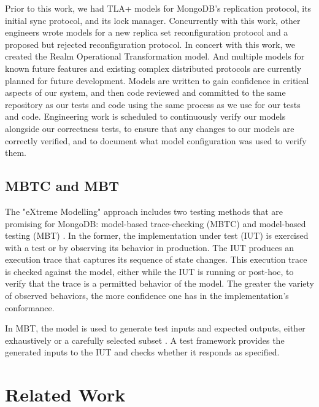 \documentclass{vldb}
\begin{document}
Prior to this work, we had TLA+ models for MongoDB's replication protocol, its initial sync protocol, and its lock manager.
Concurrently with this work, other engineers wrote models for a new replica set reconfiguration protocol and a proposed but rejected reconfiguration protocol.
In concert with this work, we created the Realm Operational Transformation model.
And multiple models for known future features and existing complex distributed protocols are currently planned for future development.
Models are written to gain confidence in critical aspects of our system, and then code reviewed and committed to the same repository as our tests and code using the same process as we use for our tests and code.
Engineering work is scheduled to continuously verify our models alongside our correctness tests, to ensure that any changes to our models are correctly verified, and to document what model configuration was used to verify them.

\subsection{MBTC and MBT}
\label{subsec:background_mbtc_mbt}

The "eXtreme Modelling" approach includes two testing methods that are promising for MongoDB: model-based trace-checking (MBTC) \cite{Jard83AnApproachToTestingSpecifications, MBTC} and model-based testing (MBT) \cite{Utting06PracticalModelBasedTesting}. 
In the former, the implementation under test (IUT) is exercised with a test or by observing its behavior in production.
The IUT produces an execution trace that captures its sequence of state changes.
This execution trace is checked against the model, either while the IUT is running or post-hoc, to verify that the trace is a permitted behavior of the model.
The greater the variety of observed behaviors, the more confidence one has in the implementation's conformance.

In MBT, the model is used to generate test inputs and expected outputs, either exhaustively or a carefully selected subset \cite{Dick93AutomatingGenerationOfTests}.
A test framework provides the generated inputs to the IUT and checks whether it responds as specified.

\section{Related Work}
\label{sec:related_work}
\end{document}
